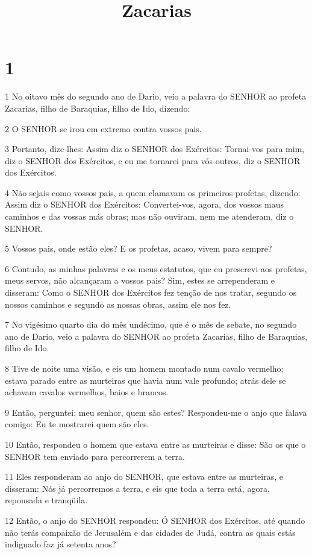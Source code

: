 

\title{Zacarias}


\chapter{1}

\par 1 No oitavo mês do segundo ano de Dario, veio a palavra do SENHOR ao profeta Zacarias, filho de Baraquias, filho de Ido, dizendo:
\par 2 O SENHOR se irou em extremo contra vossos pais.
\par 3 Portanto, dize-lhes: Assim diz o SENHOR dos Exércitos: Tornai-vos para mim, diz o SENHOR dos Exércitos, e eu me tornarei para vós outros, diz o SENHOR dos Exércitos.
\par 4 Não sejais como vossos pais, a quem clamavam os primeiros profetas, dizendo: Assim diz o SENHOR dos Exércitos: Convertei-vos, agora, dos vossos maus caminhos e das vossas más obras; mas não ouviram, nem me atenderam, diz o SENHOR.
\par 5 Vossos pais, onde estão eles? E os profetas, acaso, vivem para sempre?
\par 6 Contudo, as minhas palavras e os meus estatutos, que eu prescrevi aos profetas, meus servos, não alcançaram a vossos pais? Sim, estes se arrependeram e disseram: Como o SENHOR dos Exércitos fez tenção de nos tratar, segundo os nossos caminhos e segundo as nossas obras, assim ele nos fez.
\par 7 No vigésimo quarto dia do mês undécimo, que é o mês de sebate, no segundo ano de Dario, veio a palavra do SENHOR ao profeta Zacarias, filho de Baraquias, filho de Ido.
\par 8 Tive de noite uma visão, e eis um homem montado num cavalo vermelho; estava parado entre as murteiras que havia num vale profundo; atrás dele se achavam cavalos vermelhos, baios e brancos.
\par 9 Então, perguntei: meu senhor, quem são estes? Respondeu-me o anjo que falava comigo: Eu te mostrarei quem são eles.
\par 10 Então, respondeu o homem que estava entre as murteiras e disse: São os que o SENHOR tem enviado para percorrerem a terra.
\par 11 Eles responderam ao anjo do SENHOR, que estava entre as murteiras, e disseram: Nós já percorremos a terra, e eis que toda a terra está, agora, repousada e tranqüila.
\par 12 Então, o anjo do SENHOR respondeu: Ó SENHOR dos Exércitos, até quando não terás compaixão de Jerusalém e das cidades de Judá, contra as quais estás indignado faz já setenta anos?

